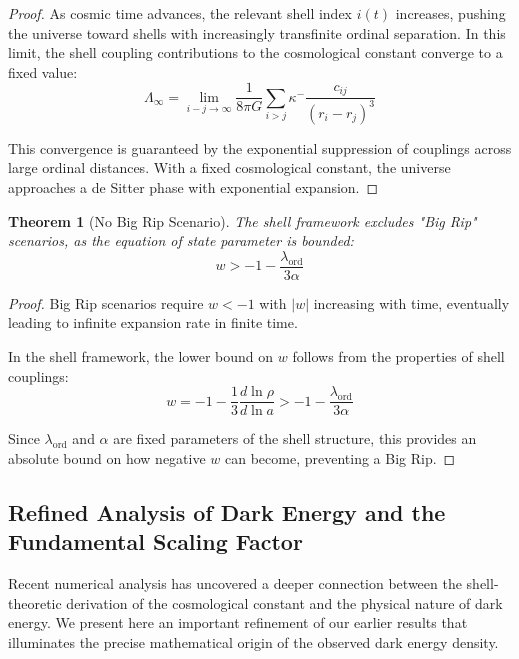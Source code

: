 \documentclass[12pt,a4paper]{article}
\newtheorem{theorem}{Theorem}[section]
\newcommand{\ord}{\text{ord}}
\begin{document}
\begin{proof}
As cosmic time advances, the relevant shell index $i(t)$ increases, pushing the universe toward shells with increasingly transfinite ordinal separation. In this limit, the shell coupling contributions to the cosmological constant converge to a fixed value:
\begin{equation}
\Lambda_{\infty} = \lim_{i-j \to \infty} \frac{1}{8\pi G} \sum_{i>j} \kappa^- \frac{c_{ij}}{(r_i - r_j)^3}
\end{equation}

This convergence is guaranteed by the exponential suppression of couplings across large ordinal distances. With a fixed cosmological constant, the universe approaches a de Sitter phase with exponential expansion.
\end{proof}

\begin{theorem}[No Big Rip Scenario]
\label{thm:no-big-rip}
The shell framework excludes "Big Rip" scenarios, as the equation of state parameter is bounded:
\begin{equation}
w > -1 - \frac{\lambda_{\ord}}{3\alpha}
\end{equation}
\end{theorem}

\begin{proof}
Big Rip scenarios require $w < -1$ with $|w|$ increasing with time, eventually leading to infinite expansion rate in finite time.

In the shell framework, the lower bound on $w$ follows from the properties of shell couplings:
\begin{equation}
w = -1 - \frac{1}{3} \frac{d \ln \rho}{d \ln a} > -1 - \frac{\lambda_{\ord}}{3\alpha}
\end{equation}

Since $\lambda_{\ord}$ and $\alpha$ are fixed parameters of the shell structure, this provides an absolute bound on how negative $w$ can become, preventing a Big Rip.
\end{proof}

\subsection{Refined Analysis of Dark Energy and the Fundamental Scaling Factor}
\label{subsec:refined-dark-energy}

Recent numerical analysis has uncovered a deeper connection between the shell-theoretic derivation of the cosmological constant and the physical nature of dark energy. We present here an important refinement of our earlier results that illuminates the precise mathematical origin of the observed dark energy density.
\end{document}
